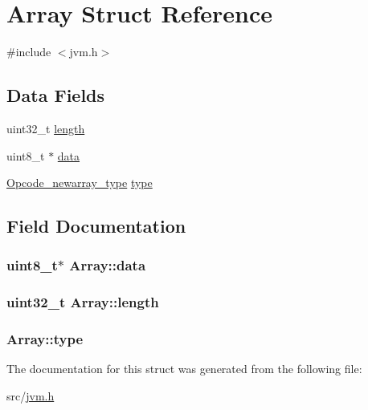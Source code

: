\hypertarget{structArray}{}\section{Array Struct Reference}
\label{structArray}


{\ttfamily \#include $<$jvm.\+h$>$}

\subsection*{Data Fields}
\begin{DoxyCompactItemize}
\item 
uint32\+\_\+t \hyperlink{structArray_a5d60f9e5118949362a8c71c0c59a62c4}{length}
\item 
uint8\+\_\+t $\ast$ \hyperlink{structArray_aa5b945659a4d6489078476468ef54e22}{data}
\item 
\hyperlink{opcodes_8h_a4cc308729b4fd75bab5788f95d7980d6}{Opcode\+\_\+newarray\+\_\+type} \hyperlink{structArray_a58d87bcdded00d5bc3782f55007c748c}{type}
\end{DoxyCompactItemize}


\subsection{Field Documentation}
\subsubsection[{\texorpdfstring{data}{data}}]{\setlength{\rightskip}{0pt plus 5cm}uint8\+\_\+t$\ast$ Array\+::data}\hypertarget{structArray_aa5b945659a4d6489078476468ef54e22}{}\label{structArray_aa5b945659a4d6489078476468ef54e22}
\subsubsection[{\texorpdfstring{length}{length}}]{\setlength{\rightskip}{0pt plus 5cm}uint32\+\_\+t Array\+::length}\hypertarget{structArray_a5d60f9e5118949362a8c71c0c59a62c4}{}\label{structArray_a5d60f9e5118949362a8c71c0c59a62c4}
\subsubsection[{\texorpdfstring{type}{type}}]{ Array\+::type}\hypertarget{structArray_a58d87bcdded00d5bc3782f55007c748c}{}\label{structArray_a58d87bcdded00d5bc3782f55007c748c}


The documentation for this struct was generated from the following file\+:\begin{DoxyCompactItemize}
\item 
src/\hyperlink{jvm_8h}{jvm.\+h}\end{DoxyCompactItemize}
